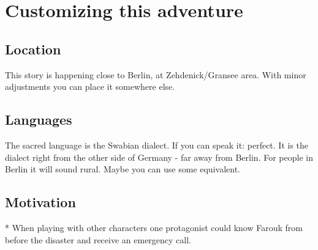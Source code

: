 \section{Customizing this adventure}

\subsection{Location}
This story is happening close to Berlin, at Zehdenick/Gransee area. With minor adjustments you can place it somewhere else.

\subsection{Languages}
The sacred language is the Swabian dialect. If you can speak it: perfect. It is the dialect right from the other side of Germany - far away from Berlin. For people in Berlin it will sound rural. Maybe you can use some equivalent.

\subsection{Motivation}

* When playing with other characters one protagonist could know Farouk from before the disaster and receive an emergency call.
